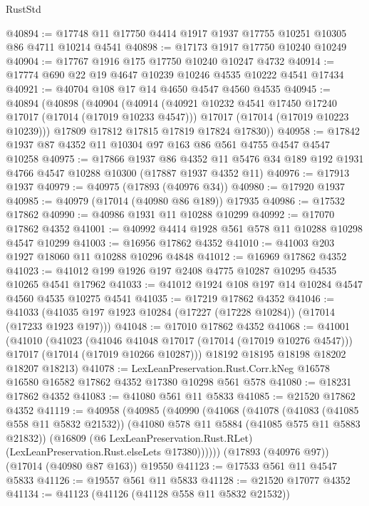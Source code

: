 \begin{lexlean}{RustStd}
\begin{coremodule}
{\begin{coremodule}
{{{{{{{{{{{{{{{{{{{{{{{{{{{{{{{{{{{{{{{{{{{{{{{{{{{{{{{@40894 := @17748 @11 @17750 @4414 @1917 @1937 @17755 @10251 @10305 @86 @4711 @10214 @4541
@40898 := @17173 @1917 @17750 @10240 @10249
@40904 := @17767 @1916 @175 @17750 @10240 @10247 @4732
@40914 := @17774 @690 @22 @19 @4647 @10239 @10246 @4535 @10222 @4541 @17434
@40921 := @40704 @108 @17 @14 @4650 @4547 @4560 @4535
@40945 := @40894
    (@40898
      (@40904
        (@40914
          (@40921 @10232 @4541 @17450 @17240 @17017 (@17014 (@17019 @10233 @4547)))
          @17017
          (@17014 (@17019 @10223 @10239)))
        @17809
        @17812
        @17815
        @17819
        @17824
        @17830))
@40958 := @17842 @1937 @87 @4352 @11 @10304 @97 @163 @86 @561 @4755 @4547 @4547 @10258
@40975 := @17866
    @1937
    @86
    @4352
    @11
    @5476
    @34
    @189
    @192
    @1931
    @4766
    @4547
    @10288
    @10300
    (@17887 @1937 @4352 @11)
@40976 := @17913 @1937
@40979 := @40975 (@17893 (@40976 @34))
@40980 := @17920 @1937
@40985 := @40979 (@17014 (@40980 @86 @189)) @17935
@40986 := @17532 @17862
@40990 := @40986 @1931 @11 @10288 @10299
@40992 := @17070 @17862 @4352
@41001 := @40992 @4414 @1928 @561 @578 @11 @10288 @10298 @4547 @10299
@41003 := @16956 @17862 @4352
@41010 := @41003 @203 @1927 @18060 @11 @10288 @10296 @4848
@41012 := @16969 @17862 @4352
@41023 := @41012 @199 @1926 @197 @2408 @4775 @10287 @10295 @4535 @10265 @4541 @17962
@41033 := @41012 @1924 @108 @197 @14 @10284 @4547 @4560 @4535 @10275 @4541
@41035 := @17219 @17862 @4352
@41046 := @41033 (@41035 @197 @1923 @10284 (@17227 (@17228 @10284)) (@17014 (@17233 @1923 @197)))
@41048 := @17010 @17862 @4352
@41068 := @41001
    (@41010
      (@41023
        (@41046 @41048 @17017 (@17014 (@17019 @10276 @4547)))
        @17017
        (@17014 (@17019 @10266 @10287)))
      @18192
      @18195
      @18198
      @18202
      @18207
      @18213)
@41078 := LexLeanPreservation.Rust.Corr.kNeg
    @16578
    @16580
    @16582
    @17862
    @4352
    @17380
    @10298
    @561
    @578
@41080 := @18231 @17862 @4352
@41083 := @41080 @561 @11 @5833
@41085 := @21520 @17862 @4352
@41119 := @40958
    (@40985
      (@40990
        (@41068
          (@41078
            (@41083 (@41085 @558 @11 @5832 @21532))
            (@41080 @578 @11 @5884 (@41085 @575 @11 @5883 @21832))
            (@16809
              (@6 LexLeanPreservation.Rust.RLet)
              (LexLeanPreservation.Rust.elseLets @17380))))))
    (@17893 (@40976 @97))
    (@17014 (@40980 @87 @163))
    @19550
@41123 := @17533 @561 @11 @4547 @5833
@41126 := @19557 @561 @11 @5833
@41128 := @21520 @17077 @4352
@41134 := @41123 (@41126 (@41128 @558 @11 @5832 @21532))
}}}}}}}}}}}}}}}}}}}}}}}}}}}}}}}}}}}}}}}}}}}}}}}}}}}}}}}
\end{coremodule}}
\end{coremodule}
\end{lexlean}
